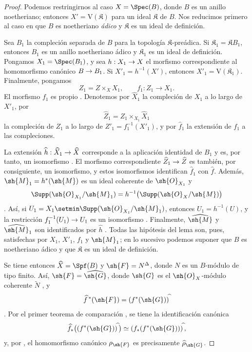 \documentclass[oneside]{amsart}
\makeatletter
\newcommand{\ega@arrow}[2]{\mathchoice{#1}{#2}{#2}{#2}}
\renewcommand{\to}{\ega@arrow{\longrightarrow}{\rightarrow}}
\newcommand{\oldpage}[2][]{{\marginnote{\normalfont\textbf{#1}~|~#2}}\ignorespaces}
\makeatother
\begin{document}
\begin{proof}
Podemos restringirnos al caso $X=\Spec(B)$, donde $B$ es un
anillo noetheriano; entonces $X'=\mathrm{V}(\mathfrak{K})$ para un ideal
$\mathfrak{K}$ de $B$. Nos reducimos primero al caso en que $B$ es
noetheriano \emph{ádico} y $\mathfrak{K}$ es un ideal de definición.

Sea $B_1$ la compleción separada de $B$ para la
topología $\mathfrak{K}$-preádica.
\oldpage[III]{155}
Si $\mathfrak{K}_1=\mathfrak{K}B_1$, entonces $B_1$ es un anillo
noetheriano ádico y $\mathfrak{K}_1$ es un ideal de definición.
Pongamos $X_1=\Spec(B_1)$, y sea $h:X_1\to X$ el morfismo
correspondiente al homomorfismo canónico $B\to B_1$. Si
$X'_1=h^{-1}(X')$, entonces $X'_1=\mathrm{V}(\mathfrak{K}_1)$. Finalmente,
pongamos
\[
  Z_1=Z\times_X X_1,\qquad f_1:Z_1\longrightarrow X_1.
\]
El morfismo $f_1$ es propio . Denotemos por
$\widehat{X}_1$ la compleción de $X_1$ a lo largo de $X'_1$, por
\[
  \widehat{Z}_1=
  Z_1\times_{X_1}\widehat{X}_1
\]
la compleción de $Z_1$ a lo largo de
$Z'_1=f_1^{-1}(X'_1)$, y por
$\widehat{f}_1$ la extensión de $f_1$ a las compleciones.

La extensión
$\widehat{h}:\widehat{X}_1\to\widehat{X}$ corresponde a la
aplicación identidad de $B_1$ y es, por tanto, un isomorfismo
. El morfismo correspondiente
$\widehat{Z}_1\to\widehat{Z}$ es también, por consiguiente, un isomorfismo,
y estos isomorfismos identifican $\widehat{f}_1$ con
$\widehat{f}$. Además,
$\sh{M}_1=h^*(\sh{M})$ es un ideal coherente de $\sh{O}_{X_1}$ y
\[
  \Supp(\sh{O}_{X_1}/\sh{M}_1)
  =h^{-1}\bigl(\Supp(\sh{O}_X/\sh{M})\bigr)
\]
. Así, si
$U_1=X_1\setmin\Supp(\sh{O}_{X_1}/\sh{M}_1)$, entonces
$U_1=h^{-1}(U)$, y la restricción
$f_1^{-1}(U_1)\to U_1$ es un isomorfismo
. Finalmente, $\widehat{\sh{M}}$ y
$\widehat{\sh{M}}_1$ son identificados por $\widehat{h}$
. Todas las hipótesis del lema son, pues,
satisfechas por $X_1$, $X'_1$, $f_1$ y $\sh{M}_1$; en lo sucesivo
podemos suponer que $B$ es noetheriano ádico y que $\mathfrak{K}$ es
un ideal de definición.

Se tiene entonces $\widehat{X}=\Spf(B)$ y
$\sh{F}=N^\Delta$, donde $N$ es un $B$-módulo de tipo finito. Así,
$\sh{F}=\widehat{\sh{G}}$, donde $\sh{G}$ es el
$\sh{O}_X$-módulo coherente $\widetilde{N}$ , y
\[
  \widehat{f}^{\,*}(\sh{F})
  =(f^*(\sh{G}))^{\widehat{\,}}
\]
. Por el primer teorema de comparación
, se tiene la identificación canónica
\[
  \widehat{f}_*
  \bigl((f^*(\sh{G}))^{\widehat{\,}}\bigr)
  \simeq
  (f_*(f^*(\sh{G})))^{\widehat{\,}},
\]
y, por , el homomorfismo canónico
$\rho_{\sh{F}}$ es precisamente $\widehat{\rho}_{\sh{G}}$.


\end{proof}
\end{document}
